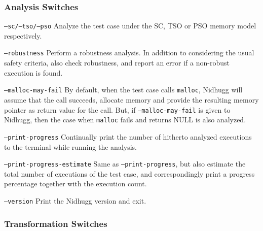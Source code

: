 \documentclass[a4paper]{article}
\begin{document}
\subsubsection{Analysis Switches}\label{sec:analysis:switches}

\begin{description}
\item{\texttt{--sc/--tso/--pso}}
%
  Analyze the test case under the SC, TSO or PSO memory model
  respectively.
\item{\texttt{--robustness}}
%
  Perform a robustness analysis. In addition to considering the usual
  safety criteria, also check robustness, and report an error if a
  non-robust execution is found.
\item{\texttt{--malloc-may-fail}}
%
  By default, when the test case calls \texttt{malloc}, Nidhugg will
  assume that the call succeeds, allocate memory and provide the
  resulting memory pointer as return value for the call. But, if
  \texttt{--malloc-may-fail} is given to Nidhugg, then the case when
  \texttt{malloc} fails and returns NULL is also analyzed.
\item{\texttt{--print-progress}}
%
  Continually print the number of hitherto analyzed executions to the
  terminal while running the analysis.
\item{\texttt{--print-progress-estimate}}
%
  Same as \texttt{--print-progress}, but also estimate the total
  number of executions of the test case, and correspondingly print a
  progress percentage together with the execution count.
\item{\texttt{--version}}
%
  Print the Nidhugg version and exit.
\end{description}

\subsubsection{Transformation Switches}\label{sec:transform:switches}
\end{document}
